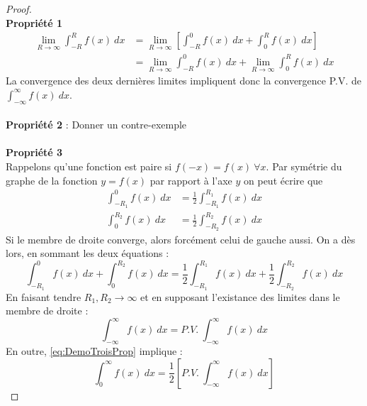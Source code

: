 \begin{proof}\ \\
	\textbf{Propriété 1}
	\begin{equation}
		\begin{array}{ll}
			\lim\limits_{R\rightarrow\infty} \int_{-R}^R f(x)\ dx & = \lim\limits_{R\rightarrow\infty}                                                        
			\left[\int_{-R}^0 f(x)\ dx+\int_0^R f(x)\ dx\right]\\
			                                                      & = \lim\limits_{R\rightarrow\infty} \int_{-R}^0 f(x)\ dx+ \lim\limits_{R\rightarrow\infty} 
			\int_0^R f(x)\ dx
		\end{array}
	\end{equation}
	La convergence des deux dernières limites impliquent donc la convergence P.V. de
	$\int_{-\infty}^\infty f(x)\ dx$.\ \\
		
	\ \\
	\textbf{Propriété 2} : Donner un contre-exemple\\	
	\ \\
	\textbf{Propriété 3}\\
	Rappelons qu'une fonction est paire si $f(-x)=f(x)\ \forall x$. Par symétrie du graphe
	de la fonction $y=f(x)$ par rapport à l'axe $y$ on peut écrire que 
	\begin{equation}
		\begin{array}{ll}
			\int_{-R_1}^0 f(x)\ dx & = \frac{1}{2}\int_{-R_1}^{R_1} f(x)\ dx \\
			\int^{R_2}_0 f(x)\ dx  & = \frac{1}{2}\int_{-R_2}^{R_2} f(x)\ dx 
		\end{array}
		\label{eq:DemoTroisProp}
	\end{equation}
	Si le membre de droite converge, alors forcément celui de gauche aussi. On a dès lors, 
	en sommant les deux équations : 
	\begin{equation}
		\int_{-R_1}^0 f(x)\ dx + \int^{R_2}_0 f(x)\ dx  = \frac{1}{2}\int_{-R_1}^{R_1} f(x)\ dx
		+ \frac{1}{2}\int_{-R_2}^{R_2} f(x)\ dx	
	\end{equation}
	En faisant tendre $R_1,R_2\rightarrow\infty$ et en supposant l'existance des limites 
	dans le membre de droite :
	\begin{equation}
		\int_{-\infty}^\infty f(x)\ dx = P.V.\	\int_{-\infty}^\infty f(x)\ dx
	\end{equation}
	En outre, \autoref{eq:DemoTroisProp} implique :
	\begin{equation}
		\int_0^\infty f(x)\ dx = \frac{1}{2}\left[P.V.\	\int_{-\infty}^\infty f(x)\ dx\right]
	\end{equation}
\end{proof}
	
